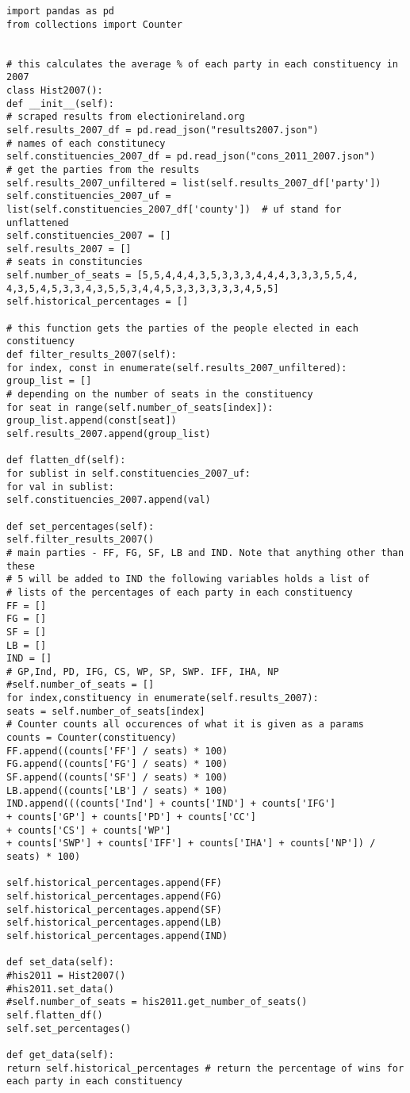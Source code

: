 \begin{verbatim}
import pandas as pd
from collections import Counter


# this calculates the average % of each party in each constituency in 2007
class Hist2007():
def __init__(self):
# scraped results from electionireland.org
self.results_2007_df = pd.read_json("results2007.json") 
# names of each constitunecy
self.constituencies_2007_df = pd.read_json("cons_2011_2007.json") 
# get the parties from the results
self.results_2007_unfiltered = list(self.results_2007_df['party']) 
self.constituencies_2007_uf = list(self.constituencies_2007_df['county'])  # uf stand for unflattened
self.constituencies_2007 = []
self.results_2007 = []
# seats in constituncies
self.number_of_seats = [5,5,4,4,4,3,5,3,3,3,4,4,4,3,3,3,5,5,4,
4,3,5,4,5,3,3,4,3,5,5,3,4,4,5,3,3,3,3,3,3,4,5,5]
self.historical_percentages = []

# this function gets the parties of the people elected in each constituency
def filter_results_2007(self): 
for index, const in enumerate(self.results_2007_unfiltered):
group_list = []
# depending on the number of seats in the constituency
for seat in range(self.number_of_seats[index]): 
group_list.append(const[seat])
self.results_2007.append(group_list)

def flatten_df(self):
for sublist in self.constituencies_2007_uf:
for val in sublist:
self.constituencies_2007.append(val)

def set_percentages(self):
self.filter_results_2007()
# main parties - FF, FG, SF, LB and IND. Note that anything other than these 
# 5 will be added to IND the following variables holds a list of 
# lists of the percentages of each party in each constituency
FF = []
FG = []
SF = []
LB = []
IND = []
# GP,Ind, PD, IFG, CS, WP, SP, SWP. IFF, IHA, NP
#self.number_of_seats = []
for index,constituency in enumerate(self.results_2007):
seats = self.number_of_seats[index]
# Counter counts all occurences of what it is given as a params
counts = Counter(constituency)
FF.append((counts['FF'] / seats) * 100)
FG.append((counts['FG'] / seats) * 100)
SF.append((counts['SF'] / seats) * 100)
LB.append((counts['LB'] / seats) * 100)
IND.append(((counts['Ind'] + counts['IND'] + counts['IFG'] 
+ counts['GP'] + counts['PD'] + counts['CC']
+ counts['CS'] + counts['WP'] 
+ counts['SWP'] + counts['IFF'] + counts['IHA'] + counts['NP']) / seats) * 100)

self.historical_percentages.append(FF)
self.historical_percentages.append(FG)
self.historical_percentages.append(SF)
self.historical_percentages.append(LB)
self.historical_percentages.append(IND)

def set_data(self):
#his2011 = Hist2007()
#his2011.set_data()
#self.number_of_seats = his2011.get_number_of_seats()
self.flatten_df()
self.set_percentages()

def get_data(self):
return self.historical_percentages # return the percentage of wins for each party in each constituency


\end{verbatim}

